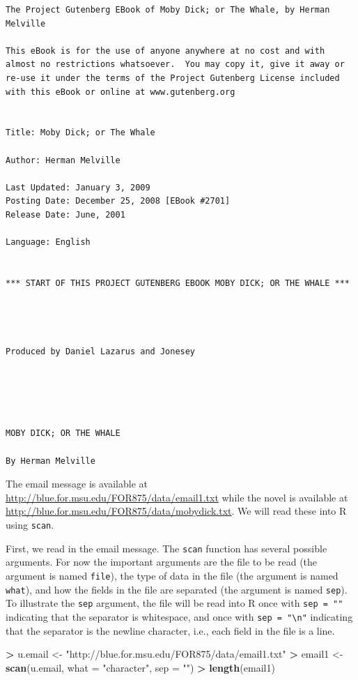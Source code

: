 \documentclass[]{krantz}
\makeatletter
\newenvironment{Shaded}{\begin{snugshade}}{\end{snugshade}}
\newcommand{\KeywordTok}[1]{\textcolor[rgb]{0.27,0.27,0.27}{\textbf{#1}}}
\newcommand{\DataTypeTok}[1]{\textcolor[rgb]{0.27,0.27,0.27}{#1}}
\newcommand{\StringTok}[1]{\textcolor[rgb]{0.5,0.5,0.5}{#1}}
\newcommand{\OperatorTok}[1]{\textcolor[rgb]{0.43,0.43,0.43}{\textbf{#1}}}
\newcommand{\NormalTok}[1]{#1}
\newenvironment{kframe}{%
\medskip{}
\setlength{\fboxsep}{.8em}
 \def\at@end@of@kframe{}%
 \ifinner\ifhmode%
  \def\at@end@of@kframe{\end{minipage}}%
  \begin{minipage}{\columnwidth}%
 \fi\fi%
 \def\FrameCommand##1{\hskip\@totalleftmargin \hskip-\fboxsep
 \colorbox{shadecolor}{##1}\hskip-\fboxsep
     \hskip-\linewidth \hskip-\@totalleftmargin \hskip\columnwidth}%
 \MakeFramed {\advance\hsize-\width
   \@totalleftmargin\z@ \linewidth\hsize
   \@setminipage}}%
 {\par\unskip\endMakeFramed%
 \at@end@of@kframe}
\renewenvironment{Shaded}{\begin{kframe}}{\end{kframe}}
\makeatother
\begin{document}
\begin{verbatim}
The Project Gutenberg EBook of Moby Dick; or The Whale, by Herman Melville

This eBook is for the use of anyone anywhere at no cost and with
almost no restrictions whatsoever.  You may copy it, give it away or
re-use it under the terms of the Project Gutenberg License included
with this eBook or online at www.gutenberg.org


Title: Moby Dick; or The Whale

Author: Herman Melville

Last Updated: January 3, 2009
Posting Date: December 25, 2008 [EBook #2701]
Release Date: June, 2001

Language: English


*** START OF THIS PROJECT GUTENBERG EBOOK MOBY DICK; OR THE WHALE ***




Produced by Daniel Lazarus and Jonesey





MOBY DICK; OR THE WHALE

By Herman Melville
\end{verbatim}

The email message is available at
\url{http://blue.for.msu.edu/FOR875/data/email1.txt} while the novel is
available at \url{http://blue.for.msu.edu/FOR875/data/mobydick.txt}. We
will read these into R using \texttt{scan}.

First, we read in the email message. The \texttt{scan} function has
several possible arguments. For now the important arguments are the file
to be read (the argument is named \texttt{file}), the type of data in
the file (the argument is named \texttt{what}), and how the fields in
the file are separated (the argument is named \texttt{sep}). To
illustrate the \texttt{sep} argument, the file will be read into R once
with \texttt{sep\ =\ ""} indicating that the separator is whitespace,
and once with \texttt{sep\ =\ "\textbackslash{}n"} indicating that the
separator is the newline character, i.e., each field in the file is a
line.

\begin{Shaded}
\begin{Highlighting}[]
\OperatorTok{>}\StringTok{ }\NormalTok{u.email <-}\StringTok{ "http://blue.for.msu.edu/FOR875/data/email1.txt"}
\OperatorTok{>}\StringTok{ }\NormalTok{email1 <-}\StringTok{ }\KeywordTok{scan}\NormalTok{(u.email, }\DataTypeTok{what =} \StringTok{"character"}\NormalTok{, }\DataTypeTok{sep =} \StringTok{""}\NormalTok{)}
\OperatorTok{>}\StringTok{ }\KeywordTok{length}\NormalTok{(email1)}
\end{Highlighting}
\end{Shaded}
\end{document}
